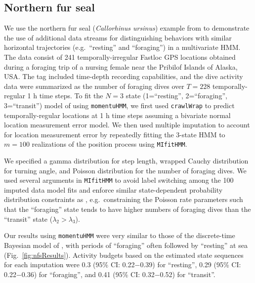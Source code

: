 \documentclass[12pt]{article}\usepackage[]{graphicx}\usepackage[]{color}
\begin{document}
\subsection{Northern fur seal}
\label{sec:nfs}
We use the northern fur seal ({\it Callorhinus ursinus}) example from \cite{McClintockEtAl2014b} to demonstrate the use of additional data streams for distinguishing behaviors with similar horizontal trajectories (e.g.\ ``resting'' and ``foraging'') in a multivariate HMM. The data consist of 241 temporally-irregular Fastloc GPS locations obtained during a foraging trip of a nursing female near the Pribilof Islands of Alaska, USA. The tag included time-depth recording capabilities, and the dive activity data were summarized as the number of foraging dives over $T=228$ temporally-regular 1 h time steps. To fit the $N=3$ state (1=``resting'', 2=``foraging'', 3=``transit'') model of \cite{McClintockEtAl2014b} using \verb|momentuHMM|, we first used \verb|crawlWrap| to predict temporally-regular locations at 1 h time steps assuming a bivariate normal location measurement error model. %
We then used multiple imputation to account for location measurement error by repeatedly fitting the 3-state HMM to $m=100$ realizations of the position process using \verb|MIfitHMM|.

We specified a gamma distribution for step length, wrapped Cauchy distribution for turning angle, and Poisson distribution for the number of foraging dives. We used several arguments in \verb|MIfitHMM| to avoid label switching among the 100 imputed data model fits and enforce similar state-dependent probability distribution constraints as \cite{McClintockEtAl2014b}, e.g.\ constraining the Poisson rate parameters such that the ``foraging'' state tends to have higher numbers of foraging dives than the ``transit'' state ($\lambda_2 > \lambda_3$). %

Our results using \verb|momentuHMM| were very similar to those of the discrete-time Bayesian model of \cite{McClintockEtAl2014b}, with periods of ``foraging'' often followed by ``resting'' at sea (Fig.\ \ref{fig:nfsResults}).  Activity budgets based on the estimated state sequences for each imputation were 0.3 (95\% CI: 0.22$-$0.39) for ``resting'', 0.29 (95\% CI: 0.22$-$0.36) for ``foraging'', and 0.41 (95\% CI: 0.32$-$0.52) for ``transit''.
\end{document}
